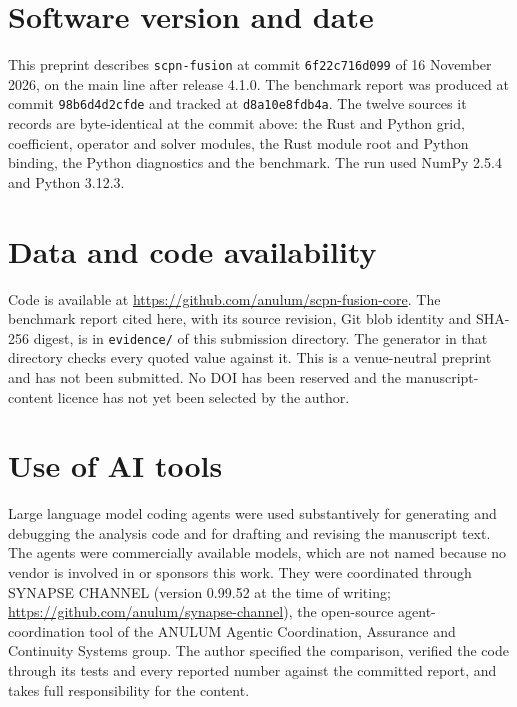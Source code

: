 \documentclass[11pt]{article}
\begin{document}
\section*{Software version and date}

This preprint describes \texttt{scpn-fusion} at commit \texttt{6f22c716d099}
of 16 November 2026, on the main line after release 4.1.0.  The benchmark
report was produced at commit \texttt{98b6d4d2cfde} and tracked at
\texttt{d8a10e8fdb4a}.  The twelve sources it records are byte-identical at
the commit above: the Rust and Python grid, coefficient, operator and solver
modules, the Rust module root and Python binding, the Python diagnostics and
the benchmark.  The run used NumPy 2.5.4 and Python 3.12.3.

\section*{Data and code availability}

Code is available at \url{https://github.com/anulum/scpn-fusion-core}.  The
benchmark report cited here, with its source revision, Git blob identity and
SHA-256 digest, is in \texttt{evidence/} of this submission directory.  The
generator in that directory checks every quoted value against it.  This is a
venue-neutral preprint and has not been submitted.  No DOI has been reserved
and the manuscript-content licence has not yet been selected by the author.

\section*{Use of AI tools}

Large language model coding agents were used substantively for generating and
debugging the analysis code and for drafting and revising the manuscript text.
The agents were commercially available models, which are not named because no
vendor is involved in or sponsors this work.  They were coordinated through
SYNAPSE CHANNEL (version 0.99.52 at the time of writing;
\url{https://github.com/anulum/synapse-channel}), the open-source
agent-coordination tool of the ANULUM Agentic Coordination, Assurance and
Continuity Systems group.  The author specified the comparison, verified the
code through its tests and every reported number against the committed
report, and takes full responsibility for the content.


\end{document}
